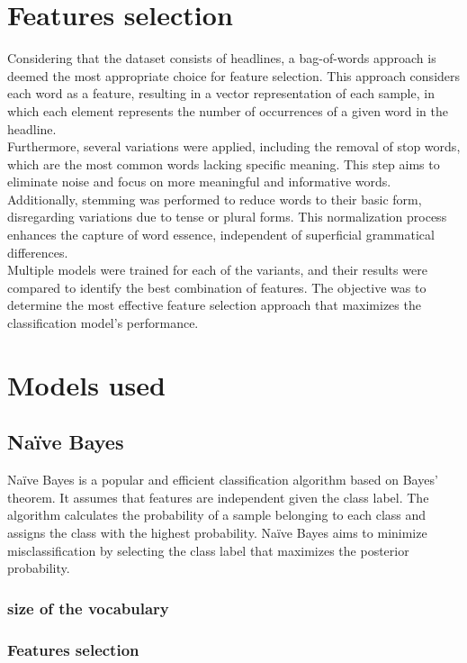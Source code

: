 \documentclass{class}
\begin{document}
\section{Features selection}
Considering that the dataset consists of headlines, a bag-of-words approach is deemed the most appropriate choice for feature selection.
This approach considers each word as a feature, resulting in a vector representation of each sample,
in which each element represents the number of occurrences of a given word in the headline.\\
Furthermore, several variations were applied, including the removal of stop words, which are the most common words lacking specific meaning.
This step aims to eliminate noise and focus on more meaningful and informative words.\\
Additionally, stemming was performed to reduce words to their basic form, disregarding variations due to tense or plural forms.
This normalization process enhances the capture of word essence, independent of superficial grammatical differences.\\
Multiple models were trained for each of the variants, and their results were compared to identify the best combination of features.
The objective was to determine the most effective feature selection approach that maximizes the classification model's performance.
\section{Models used}
\subsection{Na\"ive Bayes}
Na\"ive Bayes is a popular and efficient classification algorithm based on Bayes' theorem.
It assumes that features are independent given the class label. The algorithm calculates the probability of a
sample belonging to each class and assigns the class with the highest probability.
Na\"ive Bayes aims to minimize misclassification by selecting the class label that maximizes the posterior probability.
\subsubsection*{size of the vocabulary}
\subsubsection*{Features selection}
\end{document}
